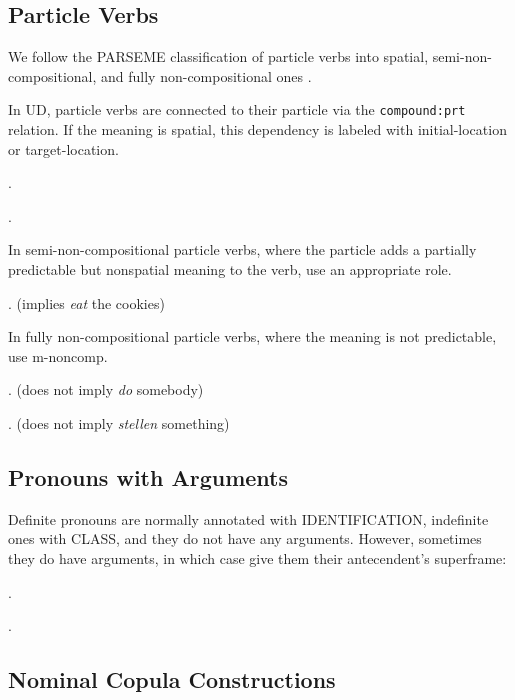 \documentclass[a4paper]{article}
\newcommand{\fr}[1]{\textsf{#1}}
\newcommand{\rl}[1]{\textsf{#1}}
\begin{document}
\newpage\subsection{Particle Verbs}

We follow the PARSEME classification of particle verbs into spatial,
semi-non-compositional, and fully non-compositional ones
\citep{savary-etal-2017-parseme,ramisch-etal-2018-edition,ramisch-etal-2020-edition,savary-etal-2023-parseme}.

In UD, particle verbs are connected to their particle via the
\texttt{compound:prt} relation. If the meaning is spatial, this dependency is
labeled with \rl{initial-location} or \rl{target-location}.

\ex.

\ex.

In semi-non-compositional particle verbs, where the particle adds a partially predictable
but nonspatial meaning to the verb, use an appropriate role.

\ex. (implies \emph{eat} the cookies)

In fully non-compositional particle verbs, where the meaning is not
predictable, use \rl{m-noncomp}.

\ex. (does not imply \emph{do} somebody)

\ex. (does not imply \emph{stellen} something)

\newpage\subsection{Pronouns with Arguments}

Definite pronouns are normally annotated with \fr{IDENTIFICATION}, indefinite
ones with \fr{CLASS}, and they do not have any arguments. However, sometimes
they do have arguments, in which case give them their antecendent's superframe:

\ex.

\ex.

\newpage\subsection{Nominal Copula Constructions}
\end{document}
